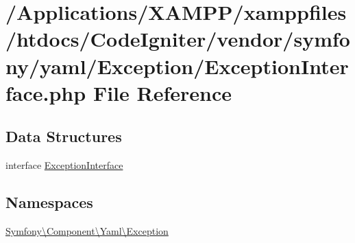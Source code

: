 \hypertarget{symfony_2yaml_2_exception_2_exception_interface_8php}{}\section{/\+Applications/\+X\+A\+M\+P\+P/xamppfiles/htdocs/\+Code\+Igniter/vendor/symfony/yaml/\+Exception/\+Exception\+Interface.php File Reference}
\label{symfony_2yaml_2_exception_2_exception_interface_8php}
\subsection*{Data Structures}
\begin{DoxyCompactItemize}
\item 
interface \mbox{\hyperlink{interface_symfony_1_1_component_1_1_yaml_1_1_exception_1_1_exception_interface}{Exception\+Interface}}
\end{DoxyCompactItemize}
\subsection*{Namespaces}
\begin{DoxyCompactItemize}
\item 
 \mbox{\hyperlink{namespace_symfony_1_1_component_1_1_yaml_1_1_exception}{Symfony\textbackslash{}\+Component\textbackslash{}\+Yaml\textbackslash{}\+Exception}}
\end{DoxyCompactItemize}
